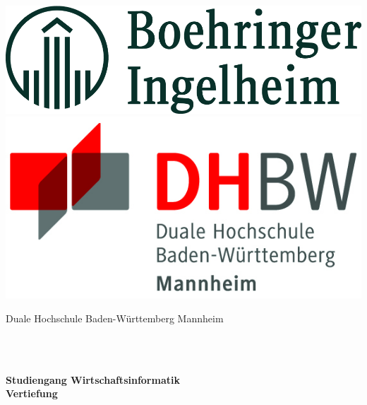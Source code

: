 \begin{titlepage}
    \begin{minipage}{\textwidth}
        \vspace{-2cm}
        \noindent \includegraphics[valign=c, scale=0.16]{Abbildungen/00_firma.png} \hfill \includegraphics [valign=c]{Abbildungen/00_dhbw_logo.jpg}
    \end{minipage}
    \vspace{1em}
    \begin{center}
        {\large Duale Hochschule Baden-W\"urttemberg Mannheim}\\[4em]
        {\textbf{\large{\DieArtDerArbeit}}}\\[6mm]
        \begin{doublespace}{\textbf{\Large{}\DerTitelDerArbeit}} \\[1.cm]
        \end{doublespace}
        {\textbf{\large{}Studiengang Wirtschaftsinformatik}}\\[4mm]
        {\textbf{Vertiefung \DieStudienrichtung}}\vspace{3em}


\end{center}
\end{titlepage}
